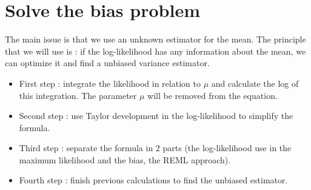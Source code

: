 \documentclass{article}
\begin{document}

\section{Solve the bias problem}
The main issue is that we use an unknown estimator for the mean. The principle that we will use is : if the log-likelihood has any information about the mean, we can optimize it and find a unbiased variance estimator.\\
\begin{itemize}
    \item First step : integrate the likelihood in relation to $\mu$ and calculate the log of this integration. The parameter $\mu$ will be removed from the equation.
    \item Second step : use Taylor development in the log-likelihood to simplify the formula. 
    \item Third step : separate the formula in $2$ parts (the log-likelihood use in the maximum likelihood and the bias, the REML approach).
    \item Fourth step : finish previous calculations to find the unbiased estimator.
\end{itemize}
\end{document}

